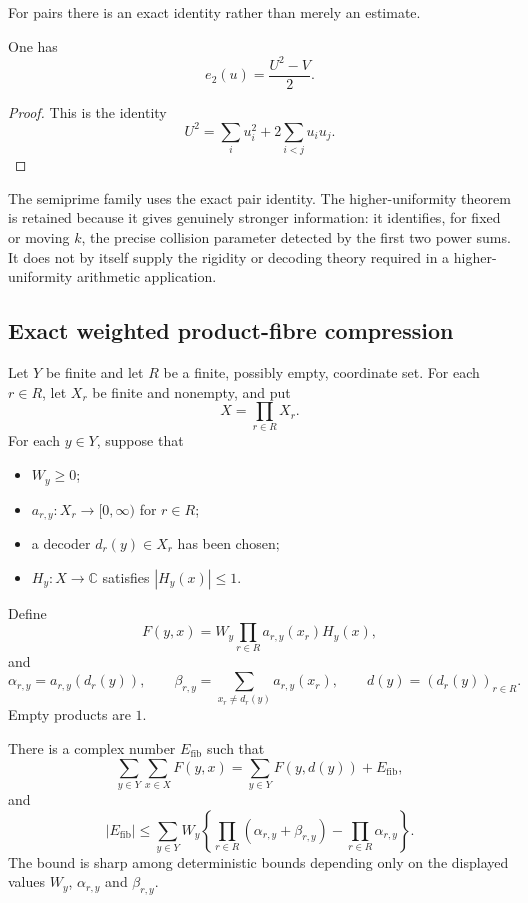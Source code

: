 For pairs there is an exact identity rather than merely an estimate.

\begin{corollary}
\label{cor:pair-identity}
One has
\[
 e_2(u)=\frac{U^2-V}{2}.
\]
\end{corollary}

\begin{proof}
This is the identity
\[
 U^2=\sum_i u_i^2+2\sum_{i<j}u_iu_j.
\]
\end{proof}

The semiprime family uses the exact pair identity.  The higher-uniformity theorem is retained because it gives genuinely stronger information: it identifies, for fixed or moving $k$, the precise collision parameter detected by the first two power sums.  It does not by itself supply the rigidity or decoding theory required in a higher-uniformity arithmetic application.

\subsection{Exact weighted product-fibre compression}

Let $Y$ be finite and let $R$ be a finite, possibly empty, coordinate set.  For each $r\in R$, let $X_r$ be finite and nonempty, and put
\[
 X=\prod_{r\in R}X_r.
\]
For each $y\in Y$, suppose that
\begin{itemize}
\item $W_y\geq0$;
\item $a_{r,y}:X_r\to[0,\infty)$ for $r\in R$;
\item a decoder $d_r(y)\in X_r$ has been chosen;
\item $H_y:X\to\mathbb C$ satisfies $|H_y(x)|\leq1$.
\end{itemize}
Define
\[
 F(y,x)=W_y\prod_{r\in R}a_{r,y}(x_r)H_y(x),
\]
and
\[
 \alpha_{r,y}=a_{r,y}(d_r(y)),
 \qquad
 \beta_{r,y}=\sum_{x_r\neq d_r(y)}a_{r,y}(x_r),
 \qquad
 d(y)=(d_r(y))_{r\in R}.
\]
Empty products are $1$.

\begin{theorem}
\label{thm:weighted-compression}
There is a complex number $E_{\mathrm{fib}}$ such that
\begin{equation}
\label{eq:fibre-decomposition}
 \sum_{y\in Y}\sum_{x\in X}F(y,x)
 =\sum_{y\in Y}F(y,d(y))+E_{\mathrm{fib}},
\end{equation}
and
\begin{equation}
\label{eq:exact-fibre-error}
 |E_{\mathrm{fib}}|
 \leq
 \sum_{y\in Y}W_y
 \left\{
   \prod_{r\in R}(\alpha_{r,y}+\beta_{r,y})
   -\prod_{r\in R}\alpha_{r,y}
 \right\}.
\end{equation}
The bound is sharp among deterministic bounds depending only on the displayed values $W_y$, $\alpha_{r,y}$ and $\beta_{r,y}$.
\end{theorem}

